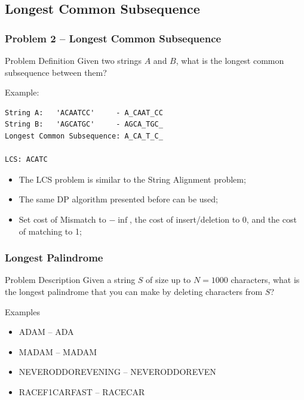 \documentclass{beamer}
\begin{document}
\subsection{Longest Common Subsequence}

\begin{frame}[fragile]
  \frametitle{Problem 2 -- Longest Common Subsequence}
  {\smaller
    \begin{block}{Problem Definition}
      Given two strings $A$ and $B$, what is the longest common
      subsequence between them?

      \medskip

      Example:
\begin{verbatim}
String A:   'ACAATCC'     - A_CAAT_CC
String B:   'AGCATGC'     - AGCA_TGC_
Longest Common Subsequence: A_CA_T_C_

LCS: ACATC
\end{verbatim}
    \end{block}

    \begin{itemize}
    \item The LCS problem is similar to the String Alignment problem;
    \item The same DP algorithm presented before can be used;
    \item Set cost of Mismatch to $-\inf$, the cost of insert/deletion
      to 0, and the cost of matching to 1;
    \end{itemize}
  }
\end{frame}

\begin{frame}
  \frametitle{Longest Palindrome}
  {\smaller
    \begin{block}{Problem Description}
      Given a string $S$ of size up to $N = 1000$ characters, what is the
      longest palindrome that you can make by deleting characters from $S$?
    \end{block}

    Examples
    \begin{itemize}
    \item ADA\alert{M} -- ADA
    \item MADAM -- MADAM
    \item NEVERODDOREVEN\alert{ING} -- NEVERODDOREVEN
    \item RACE\alert{F1}CAR\alert{FAST} -- RACECAR
    \end{itemize}

  }
\end{frame}
\end{document}
